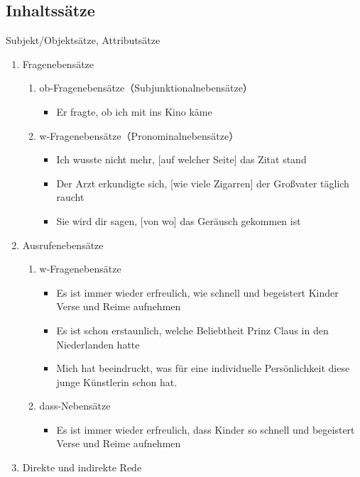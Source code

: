\documentclass[UTF8]{report}
\begin{document}
\subsection{Inhaltssätze}
Subjekt/Objektsätze, Attributsätze
\begin{enumerate}
    \item Fragenebensätze
    \begin{enumerate}
        \item ob-Fragenebensätze（Subjunktionalnebensätze）
        \begin{itemize}
            \item Er fragte, ob ich mit ins Kino käme
        \end{itemize}
        \item w-Fragenebensätze（Pronominalnebensätze）
        \begin{itemize}
            \item Ich wusste nicht mehr, [auf welcher Seite] das Zitat stand
            \item Der Arzt erkundigte sich, [wie viele Zigarren] der Großvater täglich raucht
            \item Sie wird dir sagen, [von wo] das Geräusch gekommen ist
        \end{itemize}
    \end{enumerate}
    \item Ausrufenebensätze
    \begin{enumerate}
        \item w-Fragenebensätze
        \begin{itemize}
            \item Es ist immer wieder erfreulich, wie schnell und begeistert Kinder Verse und Reime aufnehmen
            \item Es ist schon erstaunlich, welche Beliebtheit Prinz Claus in den Niederlanden hatte
            \item Mich hat beeindruckt, was für eine individuelle Persönlichkeit diese junge Künstlerin schon hat.
        \end{itemize}
        \item dass-Nebensätze
        \begin{itemize}
            \item Es ist immer wieder erfreulich, dass Kinder so schnell und begeistert Verse und Reime aufnehmen
        \end{itemize}
    \end{enumerate}
    \item Direkte und indirekte Rede

\end{enumerate}
\end{document}
